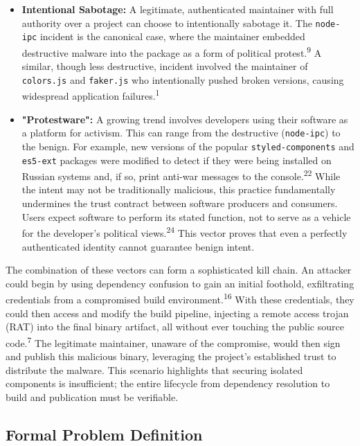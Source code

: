 \documentclass{article}
\begin{document}
\begin{itemize}
\item \textbf{Intentional Sabotage:} A legitimate, authenticated maintainer with full authority over a project can choose to intentionally sabotage it. The \lstinline{node-ipc} incident is the canonical case, where the maintainer embedded destructive malware into the package as a form of political protest.\textsuperscript{9} A similar, though less destructive, incident involved the maintainer of \lstinline{colors.js} and \lstinline{faker.js} who intentionally pushed broken versions, causing widespread application failures.\textsuperscript{1}
\item \textbf{"Protestware":} A growing trend involves developers using their software as a platform for activism. This can range from the destructive (\lstinline{node-ipc}) to the benign. For example, new versions of the popular \lstinline{styled-components} and \lstinline{es5-ext} packages were modified to detect if they were being installed on Russian systems and, if so, print anti-war messages to the console.\textsuperscript{22} While the intent may not be traditionally malicious, this practice fundamentally undermines the trust contract between software producers and consumers. Users expect software to perform its stated function, not to serve as a vehicle for the developer's political views.\textsuperscript{24} This vector proves that even a perfectly authenticated identity cannot guarantee benign intent.
\end{itemize}

The combination of these vectors can form a sophisticated kill chain. An attacker could begin by using dependency confusion to gain an initial foothold, exfiltrating credentials from a compromised build environment.\textsuperscript{16} With these credentials, they could then access and modify the build pipeline, injecting a remote access trojan (RAT) into the final binary artifact, all without ever touching the public source code.\textsuperscript{7} The legitimate maintainer, unaware of the compromise, would then sign and publish this malicious binary, leveraging the project's established trust to distribute the malware. This scenario highlights that securing isolated components is insufficient; the entire lifecycle from dependency resolution to build and publication must be verifiable.

\subsection{Formal Problem Definition}
\end{document}
